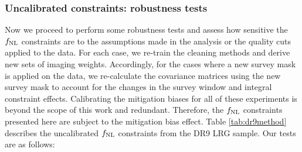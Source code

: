 \subsubsection{Uncalibrated constraints: robustness tests}
Now we proceed to perform some robustness tests and assess how sensitive the $f_{\rm NL}$ constraints are to the assumptions made in the analysis or the quality cuts applied to the data. For each case, we re-train the cleaning methods and derive new sets of imaging weights. Accordingly, for the cases where a new survey mask is applied on the data, we re-calculate the covariance matrices using the new survey mask to account for the changes in the survey window and integral constraint effects. Calibrating the mitigation biases for all of these experiments is beyond the scope of this work and redundant. Therefore, the $f_{\rm NL}$ constraints presented here are subject to the mitigation bias effect. Table \ref{tab:dr9method} describes the uncalibrated $f_{\rm NL}$ constraints from the DR9 LRG sample. Our tests are as follows:


